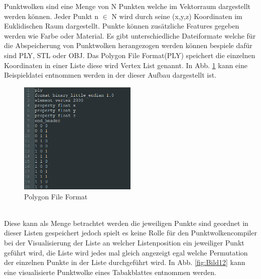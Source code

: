 \documentclass{llncs}
\begin{document}
	Punktwolken sind eine Menge von N Punkten welche im Vektorraum dargestellt werden können. Jeder Punkt n $\in$ N wird durch seine (x,y,z) Koordinaten im Euklidischen Raum dargestellt. Punkte können zusätzliche Features gegeben werden wie Farbe oder Material. Es gibt unterschiedliche Dateiformate welche für die Abspeicherung von Punktwolken herangezogen werden können bespiele dafür sind PLY, STL oder OBJ. Das Polygon File Format(PLY) speichert die einzelnen Koordinaten in einer Liste diese wird Vertex List genannt. In Abb. \ref{fig:Bild13} kann eine Beispieldatei entnommen werden in der dieser Aufbau dargestellt ist. 
	\\
	\begin{figure}[htbp] 
		\centering
		\includegraphics[width=0.5\textwidth]{plyexample.png}
		\caption{Polygon File Format}
		\label{fig:Bild13}
	\end{figure}
	\\
	Diese kann als Menge betrachtet werden die jeweiligen Punkte sind geordnet in dieser Listen gespeichert jedoch spielt es keine Rolle für den Punktwolkencompiler bei der Visualisierung der Liste an welcher Listenposition ein jeweiliger Punkt geführt wird, die Liste wird jedes mal gleich angezeigt egal welche Permutation der einzelnen Punkte in der Liste durchgeführt wird. In Abb. \ref{fig:Bild12} kann eine visualisierte Punktwolke eines Tabakblattes entnommen werden. 
	\\
\end{document}

